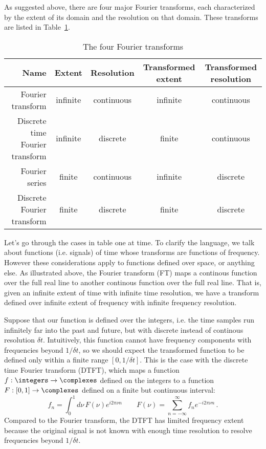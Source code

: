 As suggested above, there are four major Fourier transforms, each characterized by the extent of its domain and the resolution on that domain.
These transforms are listed in Table~\ref{tab:four_transforms}.
\begin{table}
  \begin{center}
    \begin{tabular}{|r|c|c|c|c|}
      \hline
      \textbf{Name}                   & \textbf{Extent}  & \textbf{Resolution}  & \textbf{Transformed extent}   & \textbf{Transformed resolution} \\
      \hline
      \hline
      Fourier transform               & infinite                & continuous                  & infinite                & continuous \\
      \hline
      Discrete time Fourier transform & infinite                & discrete                    & finite                  & continuous \\
      \hline
      Fourier series                  & finite                  & continuous                  & infinite                & discrete \\
      \hline
      Discrete Fourier transform      & finite                  & discrete                    & finite                  & discrete \\
      \hline
    \end{tabular}
    \caption{The four Fourier transforms}
    \label{tab:four_transforms}
  \end{center}
\end{table}
Let's go through the cases in table one at time.
To clarify the language, we talk about functions (i.e. signals) of time whose transforms are functions of frequency.
However these considerations apply to functions defined over space, or anything else.
As illustrated above, the Fourier transform (FT) maps a continous function over the full real line to another continous function over the full real line.
That is, given an infinite extent of time with infinite time resolution, we have a transform defined over infinite extent of frequency with infinite frequency resolution.

Suppose that our function is defined over the integers, i.e. the time samples run infinitely far into the past and future, but with discrete instead of continous resolution $\delta t$.
Intuitively, this function cannot have frequency components with frequencies beyond $1/\delta t$, so we should expect the transformed function to be defined only within a finite range $[0, 1/\delta t]$.
This is the case with the discrete time Fourier transform (DTFT), which maps a function $f: \integers \rightarrow \complexes$ defined on the integers to a function $F: [0, 1] \rightarrow \complexes$ defined on a finite but continuous interval:
\begin{equation}
  f_n = \int_0^1 d\nu \, F (\nu) e^{i 2 \pi \nu n}
  \qquad
  F(\nu) = \sum_{n=-\infty}^\infty f_n e^{-i 2\pi \nu n}
  \, .
\end{equation}
Compared to the Fourier transform, the DTFT has limited frequency extent because the original signal is not known with enough time resolution to resolve frequencies beyond $1/\delta t$.


